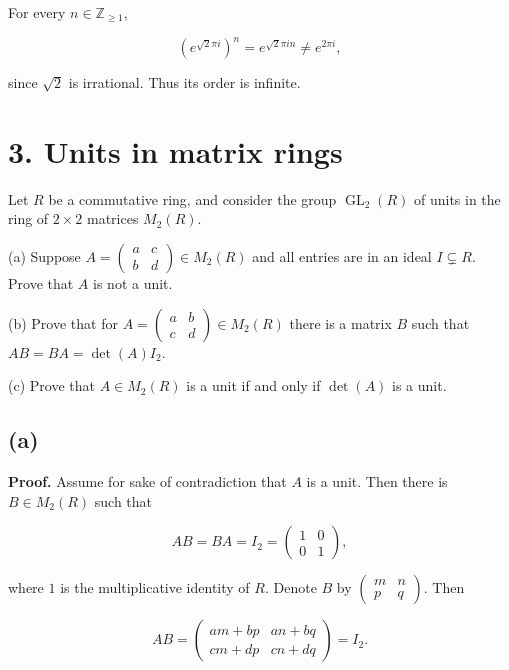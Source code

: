 For every \(n \in \mathbb{Z}_{\geq 1}\),

\[\left( e^{\sqrt{2}\pi i} \right)^{n} = e^{\sqrt{2}\pi in} \neq e^{2\pi i},\]

since \(\sqrt{2}\) is irrational. Thus its order is infinite.

\section{3. Units in matrix rings}

Let \(R\) be a commutative ring, and consider the group \(\operatorname{GL}_{2}(R)\) of units in the ring of \(2 \times 2\) matrices \(M_{2}(R)\).

(a) Suppose \(A = \begin{pmatrix}
a & c \\
b & d
\end{pmatrix} \in M_{2}(R)\) and all entries are in an ideal \(I \subsetneq R\). Prove that \(A\) is not a unit.

(b) Prove that for \(A = \begin{pmatrix}
a & b \\
c & d
\end{pmatrix} \in M_{2}(R)\) there is a matrix \(B\) such that \(AB = BA = \det(A)I_{2}\).

(c) Prove that \(A \in M_{2}(R)\) is a unit if and only if \(\det(A)\) is a unit.

\subsection{(a)}

\textbf{Proof.} Assume for sake of contradiction that \(A\) is a unit. Then there is \(B \in M_{2}(R)\) such that

\[AB = BA = I_{2} = \begin{pmatrix}
1 & 0 \\
0 & 1
\end{pmatrix},\]

where \(1\) is the multiplicative identity of \(R\). Denote \(B\) by \(\begin{pmatrix}
m & n \\
p & q
\end{pmatrix}\). Then

\[AB = \begin{pmatrix}
{am + bp} & {an + bq} \\
{cm + dp} & {cn + dq}
\end{pmatrix} = I_{2}.\]

